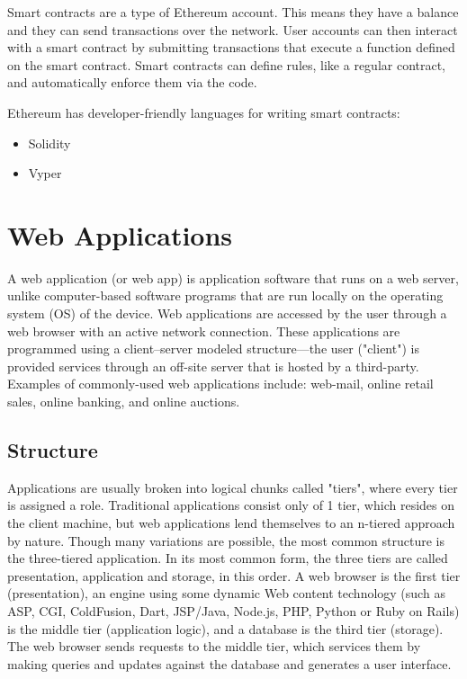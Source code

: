 Smart contracts are a type of Ethereum account. This means they have a balance and they can send transactions over the network. User accounts can then interact with a smart contract by submitting transactions that execute a function defined on the smart contract. Smart contracts can define rules, like a regular contract, and automatically enforce them via the code.\medskip

Ethereum has developer-friendly languages for writing smart contracts:

\begin{itemize}
\item Solidity
\item Vyper 
\end{itemize}

\section{Web Applications}

A web application (or web app) is application software that runs on a web server, unlike computer-based software programs that are run locally on the operating system (OS) of the device. Web applications are accessed by the user through a web browser with an active network connection. These applications are programmed using a client–server modeled structure—the user ("client") is provided services through an off-site server that is hosted by a third-party. Examples of commonly-used web applications include: web-mail, online retail sales, online banking, and online auctions.

\subsection{Structure}

Applications are usually broken into logical chunks called "tiers", where every tier is assigned a role. Traditional applications consist only of 1 tier, which resides on the client machine, but web applications lend themselves to an n-tiered approach by nature. Though many variations are possible, the most common structure is the three-tiered application.\cite{krunalMakeNtierArchitecture2008} In its most common form, the three tiers are called presentation, application and storage, in this order. A web browser is the first tier (presentation), an engine using some dynamic Web content technology (such as ASP, CGI, ColdFusion, Dart, JSP/Java, Node.js, PHP, Python or Ruby on Rails) is the middle tier (application logic), and a database is the third tier (storage). The web browser sends requests to the middle tier, which services them by making queries and updates against the database and generates a user interface.

